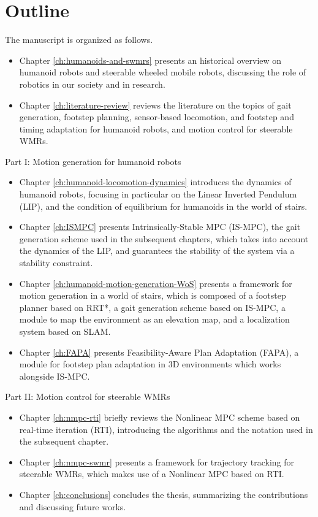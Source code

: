 \section{Outline}
The manuscript is organized as follows.
\begin{itemize}
    \item Chapter \ref{ch:humanoids-and-swmrs} presents an historical
        overview on humanoid robots and steerable wheeled mobile robots,
        discussing the role of robotics in our society and in research.
    \item Chapter \ref{ch:literature-review} reviews the literature on the topics 
        of gait generation, footstep planning, sensor-based locomotion, and footstep 
        and timing adaptation for humanoid robots, and motion control for steerable 
        WMRs.
\end{itemize}
Part I: Motion generation for humanoid robots
\begin{itemize}
    \item Chapter \ref{ch:humanoid-locomotion-dynamics} introduces the dynamics
        of humanoid robots, focusing in particular on the Linear
        Inverted Pendulum (LIP), and the condition of equilibrium for humanoids
        in the world of stairs.
    \item Chapter \ref{ch:ISMPC} presents Intrinsically-Stable MPC (IS-MPC), the gait 
        generation scheme used in the subsequent chapters,
        which takes into account the dynamics of the LIP, and guarantees the
        stability of the system via a stability constraint.
    \item Chapter \ref{ch:humanoid-motion-generation-WoS} presents a framework 
        for motion generation in a world of stairs, which is composed of a 
        footstep planner based on RRT*, a gait generation scheme based on IS-MPC,
        a module to map the environment as an elevation map, and a localization 
        system based on SLAM.
    \item Chapter \ref{ch:FAPA} presents Feasibility-Aware Plan Adaptation
        (FAPA), a module for footstep plan adaptation in 3D environments
        which works alongside IS-MPC.
\end{itemize}
Part II: Motion control for steerable WMRs
\begin{itemize}
    \item Chapter \ref{ch:nmpc-rti} briefly reviews the Nonlinear MPC scheme 
        based on real-time iteration (RTI), introducing the algorithms 
        and the notation used in the subsequent chapter.
    \item Chapter \ref{ch:nmpc-swmr} presents a framework for trajectory 
        tracking for steerable WMRs, which makes use of a Nonlinear MPC
        based on RTI.
    \item Chapter \ref{ch:conclusions} concludes the thesis, summarizing the 
        contributions and discussing future works.
\end{itemize}